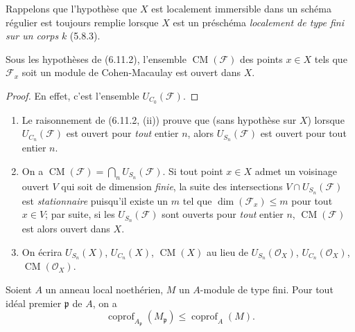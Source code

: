 Rappelons que l'hypothèse que $X$ est localement immersible dans un schéma
régulier est toujours remplie lorsque $X$ est un préschéma \emph{localement de
type fini sur un corps} $k$ (5.8.3).

\begin{corollary}[6.11.3]
\label{IV.2.s6.11.3-fr}
Sous les hypothèses de \textup{(6.11.2)}, l'ensemble $\operatorname{CM}(\mathcal F)$
des points $x\in X$ tels que $\mathcal F_x$ soit un module de
Cohen-Macaulay est ouvert dans $X$.
\end{corollary}

\begin{proof}
En effet, c'est l'ensemble $U_{C_0}(\mathcal F)$.
\end{proof}

\begin{remarks}[6.11.4]
\label{IV.2.s6.11.4-fr}
\begin{enumerate}
\item[(i)] Le raisonnement de (6.11.2, (ii)) prouve que (sans hypothèse sur
$X$) lorsque $U_{C_n}(\mathcal F)$ est ouvert pour \emph{tout} entier $n$, alors
$U_{S_n}(\mathcal F)$ est ouvert pour tout entier $n$.
\item[(ii)] On a
$\operatorname{CM}(\mathcal F)=\bigcap_nU_{S_n}(\mathcal F)$. Si tout point
$x\in X$ admet un voisinage ouvert $V$ qui soit de dimension \emph{finie}, la
suite des intersections $V\cap U_{S_n}(\mathcal F)$ est \emph{stationnaire}
puisqu'il existe un $m$ tel que $\dim(\mathcal F_x)\leq m$ pour tout
$x\in V$; par suite, si les $U_{S_n}(\mathcal F)$ sont ouverts pour \emph{tout}
entier $n$, $\operatorname{CM}(\mathcal F)$ est alors ouvert dans $X$.
\item[(iii)] On écrira $U_{S_n}(X)$, $U_{C_n}(X)$,
$\operatorname{CM}(X)$ au lieu de $U_{S_n}(\mathcal O_X)$,
$U_{C_n}(\mathcal O_X)$, $\operatorname{CM}(\mathcal O_X)$.
\end{enumerate}
\end{remarks}

\begin{proposition}[6.11.5]
\label{IV.2.s6.11.5-fr}
Soient $A$ un anneau local noethérien, $M$ un $A$-module de type fini. Pour
tout idéal premier $\mathfrak p$ de $A$, on a
\begin{equation}
\operatorname{coprof}_{A_{\mathfrak p}}(M_{\mathfrak p})\leq
\operatorname{coprof}_A(M).
\tag{6.11.5.1}\label{IV.2.s6.11.5.1-fr}
\end{equation}
\end{proposition}

